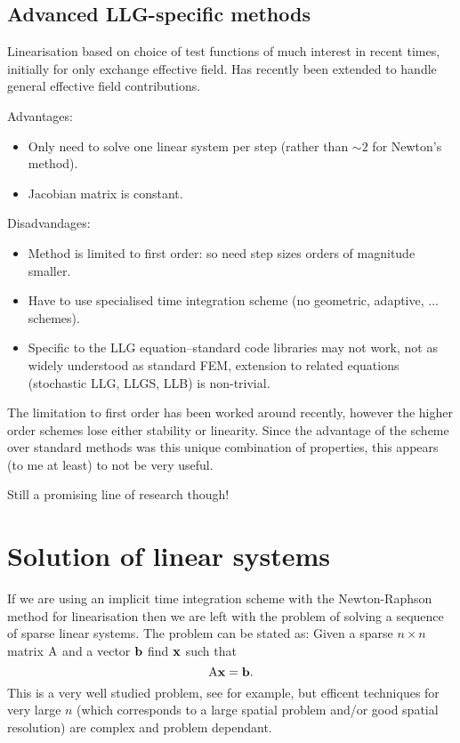 \subsection{Advanced LLG-specific methods}
\label{sec:advanced-lin}

Linearisation based on choice of test functions of much interest in recent times, initially for only exchange effective field\cite{Alouges2008}.
Has recently been extended to handle general effective field contributions\cite{Banas2012}.

Advantages:
\begin{itemize}
\item Only need to solve one linear system per step (rather than $\sim 2$ for Newton's method).
\item Jacobian matrix is constant.
\end{itemize}

Disadvandages:
\begin{itemize}
\item Method is limited to first order: so need step sizes orders of magnitude smaller.
\item Have to use specialised time integration scheme (no geometric, adaptive, ... schemes).
\item Specific to the LLG equation--standard code libraries may not work, not as widely understood as standard FEM, extension to related equations (stochastic LLG, LLGS, LLB) is non-trivial.
\end{itemize}

The limitation to first order has been worked around recently, however the higher order schemes lose either stability or linearity\cite{Kritsikis2014}.
Since the advantage of the scheme over standard methods was this unique combination of properties, this appears (to me at least) to not be very useful.

Still a promising line of research though!


\section{Solution of linear systems}
\label{sec:solution-lin-sys}

If we are using an implicit time integration scheme with the Newton-Raphson method for linearisation then we are left with the problem of solving a sequence of sparse linear systems.
The problem can be stated as: Given a sparse $n \times n $ matrix $\mathrm{A}$ and a vector ${\mathbf{b}}$ find $\mathbf{x}$ such that
\begin{equation}
  \label{eq:linear-system}
  \mathrm{A} \mathbf{x} = {\mathbf{b}}.
\end{equation}
This is a very well studied problem, see for example\cite{Saad2000}, but efficent techniques for very large $n$ (which corresponds to a large spatial problem and/or good spatial resolution) are complex and problem dependant.


